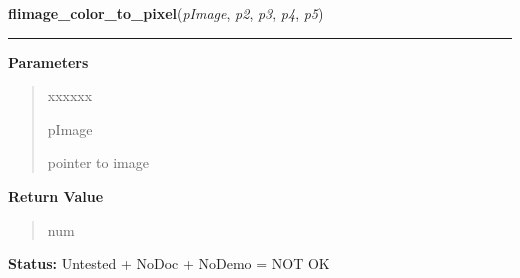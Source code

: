 \hspace{.8\funcindent}\begin{boxedminipage}{\funcwidth}

    \raggedright \textbf{flimage\_color\_to\_pixel}(\textit{pImage}, \textit{p2}, \textit{p3}, \textit{p4}, \textit{p5})

    \vspace{-1.5ex}

    \rule{\textwidth}{0.5\fboxrule}
\setlength{\parskip}{2ex}
\setlength{\parskip}{1ex}
      \textbf{Parameters}
      \vspace{-1ex}

      \begin{quote}
        \begin{Ventry}{xxxxxx}

          \item[pImage]

          pointer to image

        \end{Ventry}

      \end{quote}

      \textbf{Return Value}
    \vspace{-1ex}

      \begin{quote}
      num

      \end{quote}

\textbf{Status:} Untested + NoDoc + NoDemo = NOT OK



    \end{boxedminipage}

    \label{xformslib:flflimage:flimage_combine}

    \vspace{0.5ex}

